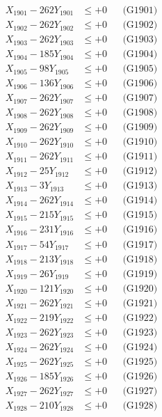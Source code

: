 \documentclass[a4paper,10pt]{article}
\begin{document}
{\begin{align}
\allowbreak
X_{1901} - 262Y_{1901} &\leq +0 && \text{(G1901)} \\
X_{1902} - 262Y_{1902} &\leq +0 && \text{(G1902)} \\
X_{1903} - 262Y_{1903} &\leq +0 && \text{(G1903)} \\
X_{1904} - 185Y_{1904} &\leq +0 && \text{(G1904)} \\
X_{1905} - 98Y_{1905} &\leq +0 && \text{(G1905)} \\
X_{1906} - 136Y_{1906} &\leq +0 && \text{(G1906)} \\
X_{1907} - 262Y_{1907} &\leq +0 && \text{(G1907)} \\
X_{1908} - 262Y_{1908} &\leq +0 && \text{(G1908)} \\
X_{1909} - 262Y_{1909} &\leq +0 && \text{(G1909)} \\
X_{1910} - 262Y_{1910} &\leq +0 && \text{(G1910)} \\
\allowbreak
X_{1911} - 262Y_{1911} &\leq +0 && \text{(G1911)} \\
X_{1912} - 25Y_{1912} &\leq +0 && \text{(G1912)} \\
X_{1913} - 3Y_{1913} &\leq +0 && \text{(G1913)} \\
X_{1914} - 262Y_{1914} &\leq +0 && \text{(G1914)} \\
X_{1915} - 215Y_{1915} &\leq +0 && \text{(G1915)} \\
X_{1916} - 231Y_{1916} &\leq +0 && \text{(G1916)} \\
X_{1917} - 54Y_{1917} &\leq +0 && \text{(G1917)} \\
X_{1918} - 213Y_{1918} &\leq +0 && \text{(G1918)} \\
X_{1919} - 26Y_{1919} &\leq +0 && \text{(G1919)} \\
X_{1920} - 121Y_{1920} &\leq +0 && \text{(G1920)} \\
\allowbreak
X_{1921} - 262Y_{1921} &\leq +0 && \text{(G1921)} \\
X_{1922} - 219Y_{1922} &\leq +0 && \text{(G1922)} \\
X_{1923} - 262Y_{1923} &\leq +0 && \text{(G1923)} \\
X_{1924} - 262Y_{1924} &\leq +0 && \text{(G1924)} \\
X_{1925} - 262Y_{1925} &\leq +0 && \text{(G1925)} \\
X_{1926} - 185Y_{1926} &\leq +0 && \text{(G1926)} \\
X_{1927} - 262Y_{1927} &\leq +0 && \text{(G1927)} \\
X_{1928} - 210Y_{1928} &\leq +0 && \text{(G1928)} \\

\end{align}}
\end{document}
